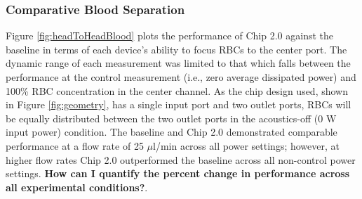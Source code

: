 \subsubsection{Comparative Blood Separation}
\label{sssec:comparisonBlood}

Figure \ref{fig:headToHeadBlood} plots the performance of Chip 2.0 against the baseline in terms of each device's ability to focus RBCs to the center port. The dynamic range of each measurement was limited to that which falls between the performance at the control measurement (i.e., zero average dissipated power) and 100\% RBC concentration in the center channel. As the chip design used, shown in Figure \ref{fig:geometry}, has a single input port and two outlet ports, RBCs will be equally distributed between the two outlet ports in the acoustics-off (0 W input power) condition. The baseline and Chip 2.0 demonstrated comparable performance at a flow rate of 25 $\mu$l/min across all power settings; however, at higher flow rates Chip 2.0 outperformed the baseline across all non-control power settings. \textbf{How can I quantify the percent change in performance across all experimental conditions?}.

